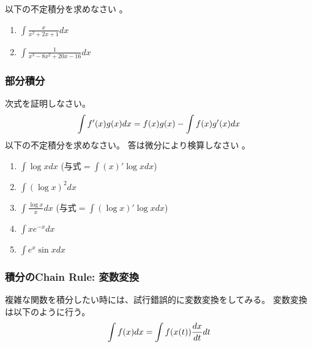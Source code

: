 \documentclass[twocolumn,11pt]{jarticle}
\begin{document}
\exercise
以下の不定積分を求めなさい
。
\begin{enumerate}
\item \label{iitem:x/(x^x+2x+1)}$\displaystyle\int\frac{x}{x^2+2x+1}dx$
\item \label{iitem:1/(x^3-8x^2+20x-16)}$\displaystyle\int\frac{1}{x^3-8x^2+20x-16}dx$
\end{enumerate}

\subsubsection{部分積分}
\question
次式を証明しなさい。
\begin{align}
  \int f'(x)g(x)dx = f(x)g(x)-\int f(x)g'(x)dx\notag
\end{align}
\exercise
以下の不定積分を求めなさい。
答は微分により検算しなさい
。
\begin{enumerate}
\item \label{item:logx}$\displaystyle\int \log x dx$
  \quad(与式$=\int(x)'\log x dx$)
\item \label{item:(logx)2}$\displaystyle\int (\log x)^2 dx$
\item \label{item:logx/x}$\displaystyle\int \frac{\log x}{x}dx$
  \quad(与式$=\int(\log x)'\log x dx$)
\item \label{item:xe-x}$\displaystyle\int xe^{-x} dx$
\item \label{item:e2sinx}$\displaystyle\int e^x\sin x dx$
\end{enumerate}

\subsubsection{積分のChain Rule: 変数変換}
複雑な関数を積分したい時には、試行錯誤的に変数変換をしてみる。
変数変換は以下のように行う。
\begin{align}
  \int f(x)dx=\int f(x(t))\frac{dx}{dt}dt\notag
\end{align}
\end{document}
